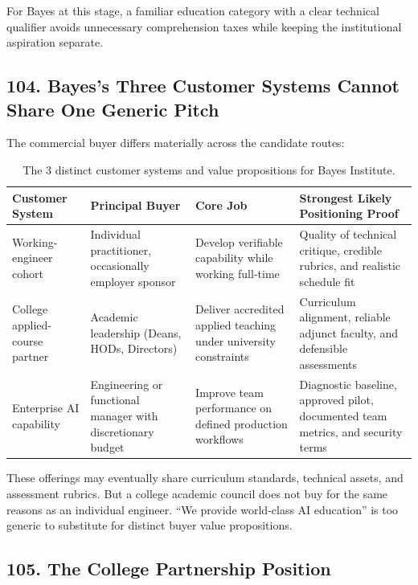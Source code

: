 For Bayes at this stage, a familiar education category with a clear technical qualifier avoids unnecessary comprehension taxes while keeping the institutional aspiration separate.

\subsection*{104. Bayes's Three Customer Systems Cannot Share One Generic Pitch}

The commercial buyer differs materially across the candidate routes:

\begin{table}[t]
\centering
\small
\begin{tabularx}{\textwidth}{>{\raggedright\arraybackslash}p{3.5cm} >{\raggedright\arraybackslash}p{4cm} >{\raggedright\arraybackslash}X >{\raggedright\arraybackslash}X}
\toprule
\textbf{Customer System} & \textbf{Principal Buyer} & \textbf{Core Job} & \textbf{Strongest Likely Positioning Proof} \\
\midrule
Working-engineer cohort & Individual practitioner, occasionally employer sponsor & Develop verifiable capability while working full-time & Quality of technical critique, credible rubrics, and realistic schedule fit \\
College applied-course partner & Academic leadership (Deans, HODs, Directors) & Deliver accredited applied teaching under university constraints & Curriculum alignment, reliable adjunct faculty, and defensible assessments \\
Enterprise AI capability & Engineering or functional manager with discretionary budget & Improve team performance on defined production workflows & Diagnostic baseline, approved pilot, documented team metrics, and security terms \\
\bottomrule
\end{tabularx}
\caption{The 3 distinct customer systems and value propositions for Bayes Institute.}
\label{tab:ch8-bayes-customer-systems}
\end{table}

These offerings may eventually share curriculum standards, technical assets, and assessment rubrics. But a college academic council does not buy for the same reasons as an individual engineer. ``We provide world-class AI education'' is too generic to substitute for distinct buyer value propositions.

\subsection*{105. The College Partnership Position}

